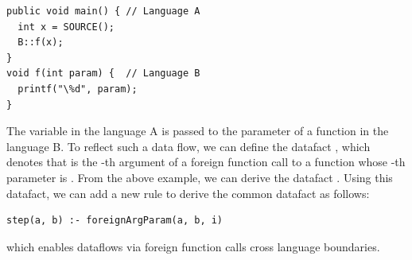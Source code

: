 \begin{lstlisting}[style=java,xleftmargin=2.5em]
public void main() { // Language A
  int x = SOURCE();
  B::f(x);
}
void f(int param) {  // Language B
  printf("\%d", param);
}
\end{lstlisting}
The variable  in the language A is passed to the parameter
of a function  in the language B.  To reflect such a data flow,
we can define the datafact ,
which denotes that  is the -th argument of a foreign
function call to a function whose -th parameter is .
From the above example, we can derive the datafact .
Using this datafact, we can add a new rule to derive the common datafact
 as follows:
\begin{lstlisting}[style=myDatalog,xleftmargin=2.5em]
step(a, b) :- foreignArgParam(a, b, i)
\end{lstlisting}
which enables dataflows via foreign function calls cross language boundaries.
